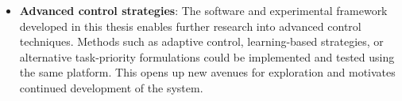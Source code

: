 \begin{itemize}
    \item \textbf{Advanced control strategies}: The software and experimental framework developed in this thesis enables further research into advanced control techniques. Methods such as adaptive control, learning-based strategies, or alternative task-priority formulations could be implemented and tested using the same platform. This opens up new avenues for exploration and motivates continued development of the system.
\end{itemize}

